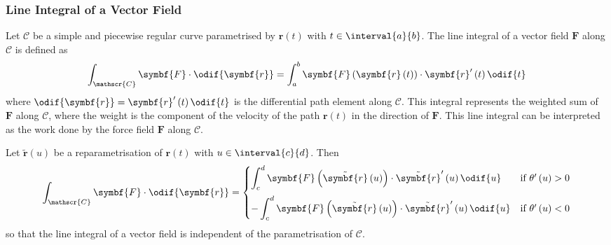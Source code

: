 \documentclass{article}
\begin{document}
\subsubsection{Line Integral of a Vector Field}
Let \(\mathscr{C}\) be a simple and piecewise regular curve
parametrised by \(\symbf{r}\left( t \right)\) with \(t \in
\interval{a}{b}\). The line integral of a vector field \(\symbf{F}\)
along \(\mathscr{C}\) is defined as
\begin{equation*}
    \int_{\mathscr{C}} \symbf{F} \cdot \odif{\symbf{r}} = \int_a^b \symbf{F}\left( \symbf{r}\left( t \right) \right) \cdot \symbf{r}'\left( t \right) \odif{t}
\end{equation*}
where \(\odif{\symbf{r}} = \symbf{r}'\left( t \right) \odif{t}\) is the
differential path element along \(\mathscr{C}\).
This integral represents the weighted sum of \(\symbf{F}\) along
\(\mathscr{C}\), where the weight is the component of the velocity of
the path \(\symbf{r}\left( t \right)\) in the direction of
\(\symbf{F}\). This line integral can be interpreted as the work done
by the force field \(\symbf{F}\) along \(\mathscr{C}\).
\begin{lemma}
    Let \(\tilde{\symbf{r}}\left( u \right)\) be a
    reparametrisation of \(\symbf{r}\left( t \right)\) with \(u \in
    \interval{c}{d}\). Then
    \begin{equation*}
        \int_{\mathscr{C}} \symbf{F} \cdot \odif{\symbf{r}} =
        \begin{cases}
            \displaystyle\int_c^d \symbf{F}\left( \tilde{\symbf{r}}\left( u \right) \right) \cdot \tilde{\symbf{r}}'\left( u \right) \odif{u}  & \text{if } \theta'\left( u \right) > 0 \\[2.5ex]
            -\displaystyle\int_c^d \symbf{F}\left( \tilde{\symbf{r}}\left( u \right) \right) \cdot \tilde{\symbf{r}}'\left( u \right) \odif{u} & \text{if } \theta'\left( u \right) < 0
        \end{cases}
    \end{equation*}
    so that the line integral of a vector field is independent of the
    parametrisation of \(\mathscr{C}\).
\end{lemma}
\end{document}
